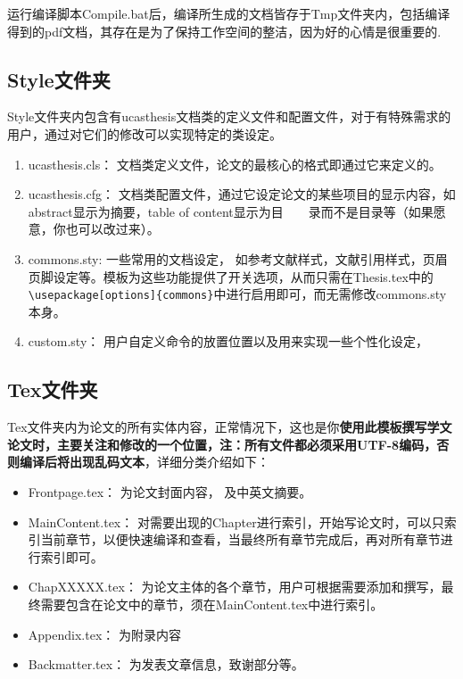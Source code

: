 运行编译脚本Compile.bat后，编译所生成的文档皆存于Tmp文件夹内，包括编译得到的pdf文档，其存在是为了保持工作空间的整洁，因为好的心情是很重要的.

\subsection{Style文件夹}

Style文件夹内包含有ucasthesis文档类的定义文件和配置文件，对于有特殊需求的用户，通过对它们的修改可以实现特定的类设定。

\begin{enumerate}
  \item ucasthesis.cls： 文档类定义文件，论文的最核心的格式即通过它来定义的。
  \item ucasthesis.cfg： 文档类配置文件，通过它设定论文的某些项目的显示内容，如abstract显示为摘要，table of content显示为目~~~~录而不是目录等（如果愿意，你也可以改过来）。
  \item commons.sty: 一些常用的文档设定， 如参考文献样式，文献引用样式，页眉页脚设定等。模板为这些功能提供了开关选项，从而只需在Thesis.tex中的\verb+\usepackage[options]{commons}+中进行启用即可，而无需修改commons.sty本身。
  \item custom.sty： 用户自定义命令的放置位置以及用来实现一些个性化设定，
\end{enumerate}

\subsection{Tex文件夹}

Tex文件夹内为论文的所有实体内容，正常情况下，这也是你\textbf{使用此模板撰写学文论文时，主要关注和修改的一个位置，注：所有文件都必须采用UTF-8编码，否则编译后将出现乱码文本}，详细分类介绍如下：

\begin{itemize}
  \item Frontpage.tex： 为论文封面内容， 及中英文摘要。
  \item Main\textunderscore Content.tex： 对需要出现的Chapter进行索引，开始写论文时，可以只索引当前章节，以便快速编译和查看，当最终所有章节完成后，再对所有章节进行索引即可。
  \item Chap\textunderscore XXXXX.tex： 为论文主体的各个章节，用户可根据需要添加和撰写，最终需要包含在论文中的章节，须在Main\textunderscore Content.tex中进行索引。
  \item Appendix.tex： 为附录内容
  \item Backmatter.tex： 为发表文章信息，致谢部分等。
\end{itemize}

